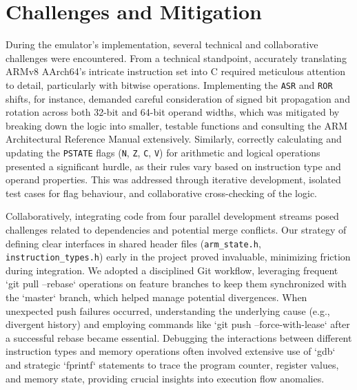 \documentclass[11pt,a4paper]{article} %
\begin{document}
\section{Challenges and Mitigation}
\label{sec:challenges}
During the emulator's implementation, several technical and collaborative challenges were encountered. From a technical standpoint, accurately translating ARMv8 AArch64's intricate instruction set into C required meticulous attention to detail, particularly with bitwise operations. Implementing the \texttt{ASR} and \texttt{ROR} shifts, for instance, demanded careful consideration of signed bit propagation and rotation across both 32-bit and 64-bit operand widths, which was mitigated by breaking down the logic into smaller, testable functions and consulting the ARM Architectural Reference Manual extensively. Similarly, correctly calculating and updating the \texttt{PSTATE} flags (\texttt{N}, \texttt{Z}, \texttt{C}, \texttt{V}) for arithmetic and logical operations presented a significant hurdle, as their rules vary based on instruction type and operand properties. This was addressed through iterative development, isolated test cases for flag behaviour, and collaborative cross-checking of the logic.

Collaboratively, integrating code from four parallel development streams posed challenges related to dependencies and potential merge conflicts. Our strategy of defining clear interfaces in shared header files (\texttt{arm\_state.h}, \texttt{instruction\_types.h}) early in the project proved invaluable, minimizing friction during integration. We adopted a disciplined Git workflow, leveraging frequent `git pull --rebase` operations on feature branches to keep them synchronized with the `master` branch, which helped manage potential divergences. When unexpected push failures occurred, understanding the underlying cause (e.g., divergent history) and employing commands like `git push --force-with-lease` after a successful rebase became essential. Debugging the interactions between different instruction types and memory operations often involved extensive use of `gdb` and strategic `fprintf` statements to trace the program counter, register values, and memory state, providing crucial insights into execution flow anomalies.
\end{document}
